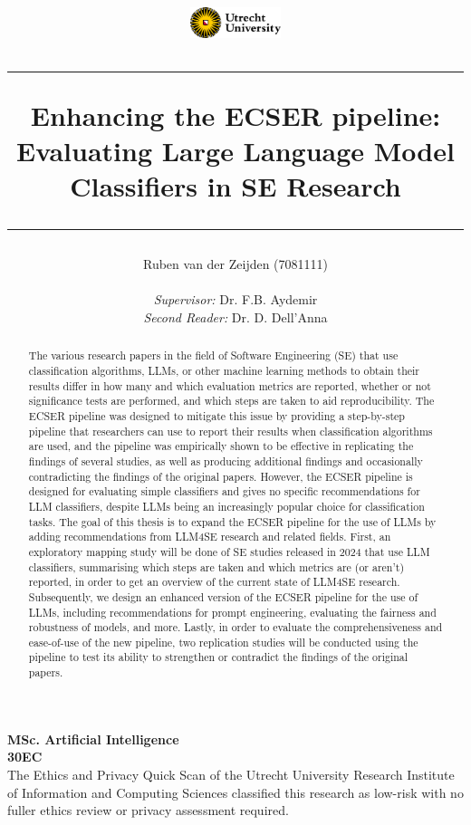 \documentclass[a4paper]{article}
\title{\includegraphics[width=0.2\textwidth]{figures/UUlogo.png} 
\vspace{0.5cm}
\hrule
\vspace{0.5cm}
\textbf{Enhancing the ECSER pipeline: Evaluating Large Language Model Classifiers in SE Research}\\
\vspace{0.5cm}
\hrule
}
\author{Ruben van der Zeijden (7081111) \\ \\
\textit{Supervisor:} Dr. F.B. Aydemir 
\\ \textit{Second Reader:} Dr. D. Dell'Anna \\
}
\begin{document}
\date{}
\maketitle
\begin{center}
\begin{abstract}
The various research papers in the field of Software Engineering (SE) that use classification algorithms, LLMs, or other machine learning methods to obtain their results differ in how many and which evaluation metrics are reported, whether or not significance tests are performed, and which steps are taken to aid reproducibility. The ECSER pipeline was designed to mitigate this issue by providing a step-by-step pipeline that researchers can use to report their results when classification algorithms are used, and the pipeline was empirically shown to be effective in replicating the findings of several studies, as well as producing additional findings and occasionally contradicting the findings of the original papers. However, the ECSER pipeline is designed for evaluating simple classifiers and gives no specific recommendations for LLM classifiers, despite LLMs being an increasingly popular choice for classification tasks. 
The goal of this thesis is to expand the ECSER pipeline for the use of LLMs by adding recommendations from LLM4SE research and related fields. First, an exploratory mapping study will be done of SE studies released in 2024 that use LLM classifiers, summarising which steps are taken and which metrics are (or aren't) reported, in order to get an overview of the current state of LLM4SE research. Subsequently, we design an enhanced version of the ECSER pipeline for the use of LLMs, including recommendations for prompt engineering, evaluating the fairness and robustness of models, and more. Lastly, in order to evaluate the comprehensiveness and ease-of-use of the new pipeline, two replication studies will be conducted using the pipeline to test its ability to strengthen or contradict the findings of the original papers.
\end{abstract}
\vfill 
\textbf{MSc. Artificial Intelligence}\\
\textbf{30EC} \\ 
\footnotesize{The Ethics and Privacy Quick Scan of the Utrecht University Research Institute of Information and Computing Sciences classified this research as low-risk with no fuller ethics review or privacy assessment required.}
\vspace{0.5cm}
\end{center}
\end{document}
